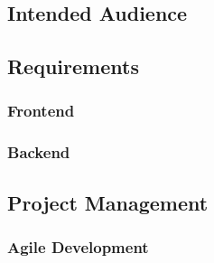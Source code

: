 \documentclass[11pt,letterpaper]{article}
\begin{document}
\subsection{Intended Audience}

\subsection{Requirements}
\subsubsection{Frontend}
\subsubsection{Backend}

\subsection{Project Management}
\subsubsection{Agile Development}




\end{document}
